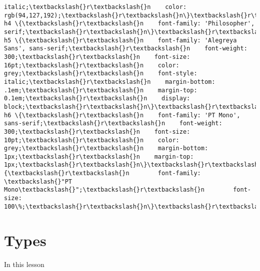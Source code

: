 \documentclass[11pt]{article}
\begin{document}
\begin{Verbatim}[commandchars=\\\{\}]
italic;\textbackslash{}r\textbackslash{}n    color: rgb(94,127,192);\textbackslash{}r\textbackslash{}n\}\textbackslash{}r\textbackslash{}n\textbackslash{}r\textbackslash{}n.text\_cell\_render h4 \{\textbackslash{}r\textbackslash{}n    font-family: 'Philosopher', serif;\textbackslash{}r\textbackslash{}n\}\textbackslash{}r\textbackslash{}n\textbackslash{}r\textbackslash{}n.text\_cell\_render h5 \{\textbackslash{}r\textbackslash{}n    font-family: 'Alegreya Sans', sans-serif;\textbackslash{}r\textbackslash{}n    font-weight: 300;\textbackslash{}r\textbackslash{}n    font-size: 16pt;\textbackslash{}r\textbackslash{}n    color: grey;\textbackslash{}r\textbackslash{}n    font-style: italic;\textbackslash{}r\textbackslash{}n    margin-bottom: .1em;\textbackslash{}r\textbackslash{}n    margin-top: 0.1em;\textbackslash{}r\textbackslash{}n    display: block;\textbackslash{}r\textbackslash{}n\}\textbackslash{}r\textbackslash{}n\textbackslash{}r\textbackslash{}n.text\_cell\_render h6 \{\textbackslash{}r\textbackslash{}n    font-family: 'PT Mono', sans-serif;\textbackslash{}r\textbackslash{}n    font-weight: 300;\textbackslash{}r\textbackslash{}n    font-size: 10pt;\textbackslash{}r\textbackslash{}n    color: grey;\textbackslash{}r\textbackslash{}n    margin-bottom: 1px;\textbackslash{}r\textbackslash{}n    margin-top: 1px;\textbackslash{}r\textbackslash{}n\}\textbackslash{}r\textbackslash{}n\textbackslash{}r\textbackslash{}n.CodeMirror\{\textbackslash{}r\textbackslash{}n        font-family: \textbackslash{}"PT Mono\textbackslash{}";\textbackslash{}r\textbackslash{}n        font-size: 100\%;\textbackslash{}r\textbackslash{}n\}\textbackslash{}r\textbackslash{}n\textbackslash{}r\textbackslash{}n</style>\textbackslash{}r\textbackslash{}n\textbackslash{}r\textbackslash{}n")
\end{Verbatim}
            
    \section{Types}\label{types}

    In this lesson
\end{document}
